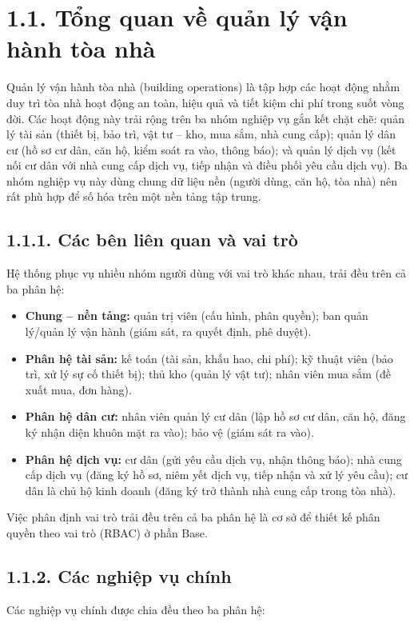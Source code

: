 \section*{1.1. Tổng quan về quản lý vận hành tòa nhà}
Quản lý vận hành tòa nhà (building operations) là tập hợp các hoạt động nhằm duy trì tòa nhà hoạt động an toàn, hiệu quả và tiết kiệm chi phí trong suốt vòng đời. Các hoạt động này trải rộng trên ba nhóm nghiệp vụ gắn kết chặt chẽ: quản lý tài sản (thiết bị, bảo trì, vật tư – kho, mua sắm, nhà cung cấp); quản lý dân cư (hồ sơ cư dân, căn hộ, kiểm soát ra vào, thông báo); và quản lý dịch vụ (kết nối cư dân với nhà cung cấp dịch vụ, tiếp nhận và điều phối yêu cầu dịch vụ). Ba nhóm nghiệp vụ này dùng chung dữ liệu nền (người dùng, căn hộ, tòa nhà) nên rất phù hợp để số hóa trên một nền tảng tập trung.

\subsection*{1.1.1. Các bên liên quan và vai trò}
Hệ thống phục vụ nhiều nhóm người dùng với vai trò khác nhau, trải đều trên cả ba phân hệ:

\begin{itemize}[leftmargin=1.4em,itemsep=1pt,topsep=2pt]
  \item \textbf{Chung – nền tảng: }quản trị viên (cấu hình, phân quyền); ban quản lý/quản lý vận hành (giám sát, ra quyết định, phê duyệt).
  \item \textbf{Phân hệ tài sản: }kế toán (tài sản, khấu hao, chi phí); kỹ thuật viên (bảo trì, xử lý sự cố thiết bị); thủ kho (quản lý vật tư); nhân viên mua sắm (đề xuất mua, đơn hàng).
  \item \textbf{Phân hệ dân cư: }nhân viên quản lý cư dân (lập hồ sơ cư dân, căn hộ, đăng ký nhận diện khuôn mặt ra vào); bảo vệ (giám sát ra vào).
  \item \textbf{Phân hệ dịch vụ: }cư dân (gửi yêu cầu dịch vụ, nhận thông báo); nhà cung cấp dịch vụ (đăng ký hồ sơ, niêm yết dịch vụ, tiếp nhận và xử lý yêu cầu); cư dân là chủ hộ kinh doanh (đăng ký trở thành nhà cung cấp trong tòa nhà).
\end{itemize}
Việc phân định vai trò trải đều trên cả ba phân hệ là cơ sở để thiết kế phân quyền theo vai trò (RBAC) ở phần Base.

\subsection*{1.1.2. Các nghiệp vụ chính}
Các nghiệp vụ chính được chia đều theo ba phân hệ:

